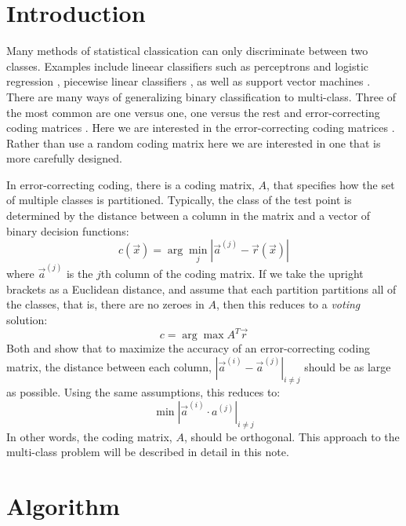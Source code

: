 
\section{Introduction}

Many methods of statistical classication can only discriminate between two classes. 
Examples include lineear classifiers such as perceptrons and logistic regression \citep{Michie_etal1994}, 
piecewise linear classifiers \cite{Herman_Yeung1992},
as well as support vector machines \citep{kernel_intro}.
There are many ways of generalizing binary classification to 
multi-class.
Three of the most common are one versus one, one versus the rest and 
error-correcting coding matrices \citep{Hsu_Lin2002}.
Here we are interested in the error-correcting coding matrices
\citep{Dietterich_Bakiri1995, Windeatt_Ghaderi2002}.
Rather than use a random coding matrix here we are interested in one that is
more carefully designed.

In error-correcting coding, there is a coding matrix, $A$, that specifies
how the set of multiple classes is partitioned.
Typically, the class of the test point is determined by the distance between
a column in the matrix and a vector of binary decision functions:
\begin{equation}
	c(\vec x) = \arg \min_j | \vec a^{(j)} - \vec r(\vec x) |
\end{equation}
where $\vec a^{(j)}$ is the $j$th column of the coding matrix.
If we take the upright brackets as a Euclidean distance, and assume that
each partition partitions all of the classes, that is, there are no zeroes
in $A$, then this reduces to a {\it voting} solution:
\begin{equation}
	c = \arg \max A^T \vec r \label{voting}
\end{equation}
Both \citet{Allwein_etal2000} and \citet{Windeatt_Ghaderi2002} show that to
maximize the accuracy of an error-correcting coding matrix, the distance
between each column, $|\vec a^{(i)} - \vec a^{(j)}|_{i \ne j}$ should be as
large as possible.
Using the same assumptions, this reduces to:
\begin{equation}
	\min |\vec a^{(i)} \cdot a^{(j)}|_{i \ne j}
\end{equation}
In other words, the coding matrix, $A$, should be orthogonal.
This approach to the multi-class problem will be described in detail in this note.

\section{Algorithm}

